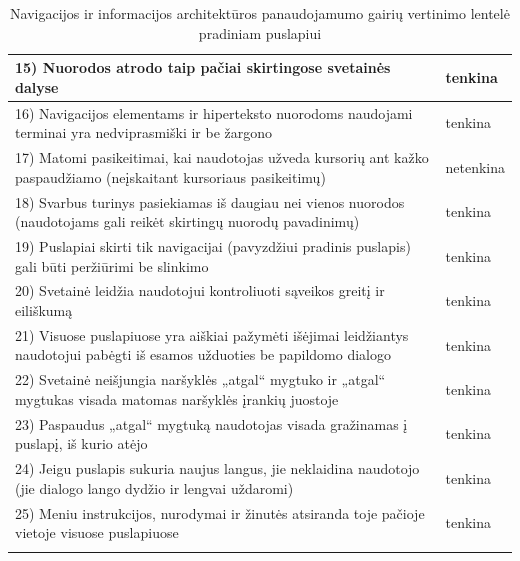\documentclass{VUMIFPSkursinis}
\begin{document}
\begin{center}
\begin{longtable}{ |p{}|p{2cm}| }
	15) Nuorodos atrodo taip pačiai skirtingose svetainės dalyse & tenkina \\ \hline
	16) Navigacijos elementams ir hiperteksto nuorodoms naudojami terminai yra nedviprasmiški ir be žargono & tenkina \\ \hline
	17) Matomi pasikeitimai, kai naudotojas užveda kursorių ant kažko paspaudžiamo (neįskaitant kursoriaus pasikeitimų) & netenkina \\ \hline
	18) Svarbus turinys pasiekiamas iš daugiau nei vienos nuorodos (naudotojams gali reikėt skirtingų nuorodų pavadinimų) & tenkina \\ \hline
	19) Puslapiai skirti tik navigacijai (pavyzdžiui pradinis puslapis) gali būti peržiūrimi be slinkimo & tenkina \\ \hline
	20) Svetainė leidžia naudotojui kontroliuoti sąveikos greitį ir eiliškumą & tenkina \\ \hline
	21) Visuose puslapiuose yra aiškiai pažymėti išėjimai leidžiantys naudotojui pabėgti iš esamos užduoties be papildomo dialogo & tenkina \\ \hline
	22) Svetainė neišjungia naršyklės „atgal“ mygtuko ir „atgal“ mygtukas visada matomas naršyklės įrankių juostoje & tenkina \\ \hline
	23) Paspaudus „atgal“ mygtuką naudotojas visada gražinamas į puslapį, iš kurio atėjo & tenkina \\ \hline
	24) Jeigu puslapis sukuria naujus langus, jie neklaidina naudotojo (jie dialogo lango dydžio ir lengvai uždaromi) & tenkina \\ \hline
	25) Meniu instrukcijos, nurodymai ir žinutės atsiranda toje pačioje vietoje visuose puslapiuose & tenkina \\ \hline
	\caption{Navigacijos ir informacijos architektūros panaudojamumo gairių vertinimo lentelė pradiniam puslapiui}
	\label{navigacijosirIAlentelėPrad}
\end{longtable}
\end{center}
\end{document}
